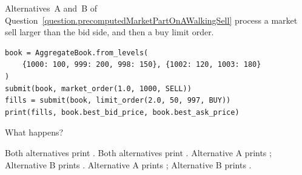 \begin{question}
\label{question.precomputedMarketPartRestsAtTheSentinel}
Alternatives~A and~B of Question~\ref{question.precomputedMarketPartOnAWalkingSell}
process a market sell larger than the bid side, and then a buy limit order.
\begin{lstlisting}[caption={Run once with each alternative}, label=listing.precomputedMarketPartRestsAtTheSentinelRun]
book = AggregateBook.from_levels(
    {1000: 100, 999: 200, 998: 150}, {1002: 120, 1003: 180}
)
submit(book, market_order(1.0, 1000, SELL))
fills = submit(book, limit_order(2.0, 50, 997, BUY))
print(fills, book.best_bid_price, book.best_ask_price)
\end{lstlisting}
What happens?
\begin{choices}
 \choice Both alternatives print .
 \choice Both alternatives print .
 \choice Alternative A prints ;
  Alternative B prints .
 \correctchoice Alternative A prints ;
  Alternative B prints .
\end{choices}
\end{question}

